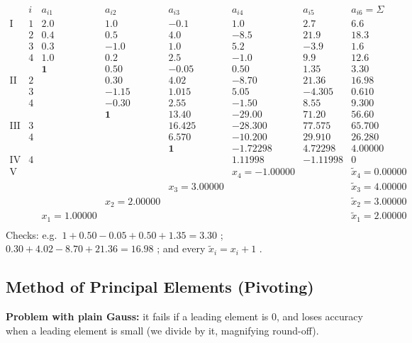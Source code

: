 \documentclass[hidelinks]{article}
\begin{document}
\[
\begin{array}{c|c|rrrrr|r}
 & i & a_{i1} & a_{i2} & a_{i3} & a_{i4} & a_{i5} & a_{i6}=\Sigma\\ \hline
\text{I} & 1 & 2.0 & 1.0 & -0.1 & 1.0 & 2.7 & 6.6\\
 & 2 & 0.4 & 0.5 & 4.0 & -8.5 & 21.9 & 18.3\\
 & 3 & 0.3 & -1.0 & 1.0 & 5.2 & -3.9 & 1.6\\
 & 4 & 1.0 & 0.2 & 2.5 & -1.0 & 9.9 & 12.6\\
 & & \mathbf{1} & 0.50 & -0.05 & 0.50 & 1.35 & 3.30\\ \hline
\text{II} & 2 & & 0.30 & 4.02 & -8.70 & 21.36 & 16.98\\
 & 3 & & -1.15 & 1.015 & 5.05 & -4.305 & 0.610\\
 & 4 & & -0.30 & 2.55 & -1.50 & 8.55 & 9.300\\
 & & & \mathbf{1} & 13.40 & -29.00 & 71.20 & 56.60\\ \hline
\text{III} & 3 & & & 16.425 & -28.300 & 77.575 & 65.700\\
 & 4 & & & 6.570 & -10.200 & 29.910 & 26.280\\
 & & & & \mathbf{1} & -1.72298 & 4.72298 & 4.00000\\ \hline
\text{IV} & 4 & & & & 1.11998 & -1.11998 & 0\\ \hline
\text{V} & & & & & x_4=-1.00000 & & \tilde x_4=0.00000\\
 & & & & x_3=3.00000 & & & \tilde x_3=4.00000\\
 & & & x_2=2.00000 & & & & \tilde x_2=3.00000\\
 & & x_1=1.00000 & & & & & \tilde x_1=2.00000\\
\end{array}
\]
Checks: e.g.\ $1+0.50-0.05+0.50+1.35=3.30$ \checkmark; $0.30+4.02-8.70+21.36=16.98$ \checkmark; and every $\tilde x_i=x_i+1$ \checkmark.

\subsection{Method of Principal Elements (Pivoting)}\label{sec:principal}

\textbf{Problem with plain Gauss:} it fails if a leading element is $0$, and loses accuracy when a leading element is small (we divide by it, magnifying round-off).
\end{document}
